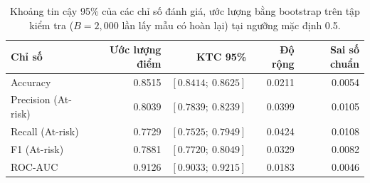 \begin{table}[H]
  \centering
  \caption{Khoảng tin cậy 95\% của các chỉ số đánh giá, ước lượng bằng bootstrap trên tập kiểm tra ($B = 2{,}000$ lần lấy mẫu có hoàn lại) tại ngưỡng mặc định 0.5.}
  \label{tab:bootstrap_ci}
  \small
  \begin{tabular}{lrrrr}
    \toprule
    \textbf{Chỉ số} & \textbf{Ước lượng điểm} & \textbf{KTC 95\%} & \textbf{Độ rộng} & \textbf{Sai số chuẩn} \\
    \midrule
    Accuracy & 0.8515 & $[0.8414;\ 0.8625]$ & 0.0211 & 0.0054 \\
    Precision (At-risk) & 0.8039 & $[0.7839;\ 0.8239]$ & 0.0399 & 0.0105 \\
    Recall (At-risk) & 0.7729 & $[0.7525;\ 0.7949]$ & 0.0424 & 0.0108 \\
    F1 (At-risk) & 0.7881 & $[0.7720;\ 0.8049]$ & 0.0329 & 0.0082 \\
    ROC-AUC & 0.9126 & $[0.9033;\ 0.9215]$ & 0.0183 & 0.0046 \\
    \bottomrule
  \end{tabular}
\end{table}
